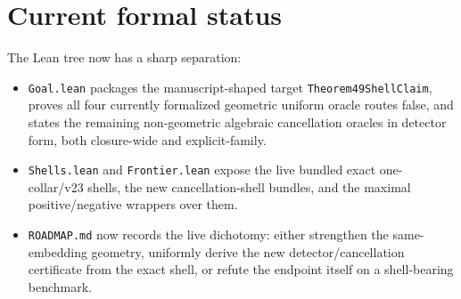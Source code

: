 \documentclass[11pt]{article}
\begin{document}
\section{Current formal status}

The Lean tree now has a sharp separation:
\begin{itemize}[leftmargin=2em]
\item \verb|Goal.lean| packages the manuscript-shaped target
  \verb|Theorem49ShellClaim|, proves all four currently formalized geometric
  uniform oracle routes false, and states the remaining non-geometric
  algebraic cancellation oracles in detector form, both closure-wide and
  explicit-family.
\item \verb|Shells.lean| and \verb|Frontier.lean| expose the live bundled
  exact one-collar/v23 shells, the new cancellation-shell bundles, and the
  maximal positive/negative wrappers over them.
\item \verb|ROADMAP.md| now records the live dichotomy: either strengthen the
  same-embedding geometry, uniformly derive the new detector/cancellation
  certificate from the exact shell, or refute the endpoint itself on a
  shell-bearing benchmark.
\end{itemize}
\end{document}
